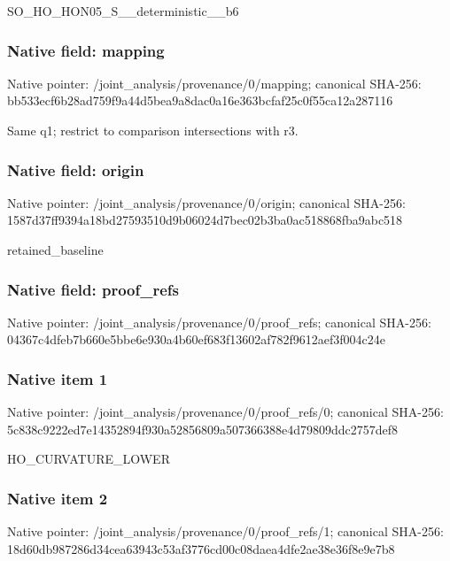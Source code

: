 \documentclass[10pt,a4paper]{article}
\begin{document}
\begingroup\raggedright\sloppy SO\_\allowbreak{}HO\_\allowbreak{}HON05\_\allowbreak{}S\_\allowbreak{}\_\allowbreak{}deterministic\_\allowbreak{}\_\allowbreak{}b6\par\endgroup

\subsubsection{Native field: mapping}
Native pointer: /joint\_\allowbreak{}analysis/provenance/0/mapping; canonical SHA-256: bb533ecf6b28ad759f9a44d5bea9a8dac0a16e363bcfaf25c0f55ca12a287116

\begingroup\raggedright\sloppy Same q1;\allowbreak{} restrict to comparison intersections with r3.\par\endgroup

\subsubsection{Native field: origin}
Native pointer: /joint\_\allowbreak{}analysis/provenance/0/origin; canonical SHA-256: 1587d37ff9394a18bd27593510d9b06024d7bec02b3ba0ac518868fba9abc518

\begingroup\raggedright\sloppy retained\_\allowbreak{}baseline\par\endgroup

\subsubsection{Native field: proof\_\allowbreak{}refs}
Native pointer: /joint\_\allowbreak{}analysis/provenance/0/proof\_\allowbreak{}refs; canonical SHA-256: 04367c4dfeb7b660e5bbe6e930a4b60ef683f13602af782f9612aef3f004c24e

\subsubsection{Native item 1}
Native pointer: /joint\_\allowbreak{}analysis/provenance/0/proof\_\allowbreak{}refs/0; canonical SHA-256: 5c838c9222ed7e14352894f930a52856809a507366388e4d79809ddc2757def8

\begingroup\raggedright\sloppy HO\_\allowbreak{}CURVATURE\_\allowbreak{}LOWER\par\endgroup

\subsubsection{Native item 2}
Native pointer: /joint\_\allowbreak{}analysis/provenance/0/proof\_\allowbreak{}refs/1; canonical SHA-256: 18d60db987286d34cea63943c53af3776cd00c08daea4dfe2ae38e36f8e9e7b8
\end{document}
